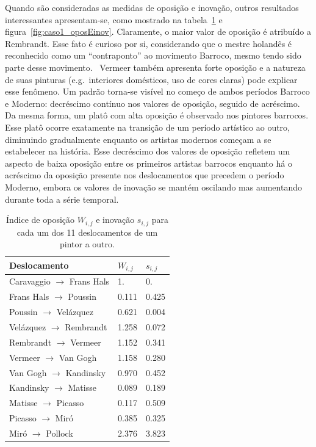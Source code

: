 Quando são consideradas as medidas de oposição e inovação, outros
resultados interessantes apresentam-se, como mostrado na
tabela~\ref{tab:opos1} e figura~\ref{fig:caso1_oposEinov}. Claramente,
o maior valor de oposição é atribuído a Rembrandt. Esse fato é curioso
por si, considerando que o mestre holandês é reconhecido como um
``contraponto'' ao movimento Barroco, mesmo tendo sido parte desse
movimento.~\cite{gombrich} Vermeer também apresenta forte oposição e a
natureza de suas pinturas (e.g.\ interiores domésticos, uso de cores
claras) pode explicar esse fenômeno. Um padrão torna-se visível no
começo de ambos períodos Barroco e Moderno: decréscimo contínuo nos
valores de oposição, seguido de acréscimo. Da mesma forma, um platô
com alta oposição é observado nos pintores barrocos. Esse platô ocorre
exatamente na transição de um período artístico ao outro, diminuindo
gradualmente enquanto os artistas modernos começam a se estabelecer na
história. Esse decréscimo dos valores de oposição refletem um aspecto
de baixa oposição entre os primeiros artistas barrocos enquanto há o
acréscimo da oposição presente nos deslocamentos que precedem o
período Moderno, embora os valores de inovação se mantém oscilando mas
aumentando durante toda a série temporal.

\begin{table}[ht]
  \begin{center}
  \caption{\label{tab:opos1}Índice de oposição $W_{i,j}$ e inovação $s_{i,j}$
    para cada um dos 11 deslocamentos de um pintor a outro.}
\begin{tabular}{@{}lll}
    \hline \hline
    Deslocamento & $W_{i,j}$ & $s_{i,j}$ \\
    \hline
    Caravaggio $\to$ Frans Hals  &   1.     &  0.     \\
    Frans Hals $\to$ Poussin     &   0.111  &  0.425  \\
    Poussin $\to$ Vel\'{a}zquez   &   0.621  &  0.004  \\
    Vel\'{a}zquez $\to$ Rembrandt &   1.258  &  0.072  \\
    Rembrandt $\to$ Vermeer      &   1.152  &  0.341  \\
    Vermeer $\to$ Van Gogh       &   1.158  &  0.280  \\
    Van Gogh $\to$ Kandinsky     &   0.970  &  0.452  \\
    Kandinsky $\to$ Matisse      &   0.089  &  0.189  \\
    Matisse $\to$ Picasso        &   0.117  &  0.509  \\
    Picasso $\to$ Mir\'{o}       &   0.385  &  0.325  \\
    Mir\'{o} $\to$ Pollock       &   2.376  &  3.823  \\
    \hline \hline
  \end{tabular}
  \fonteminha
\end{center}
\end{table}


